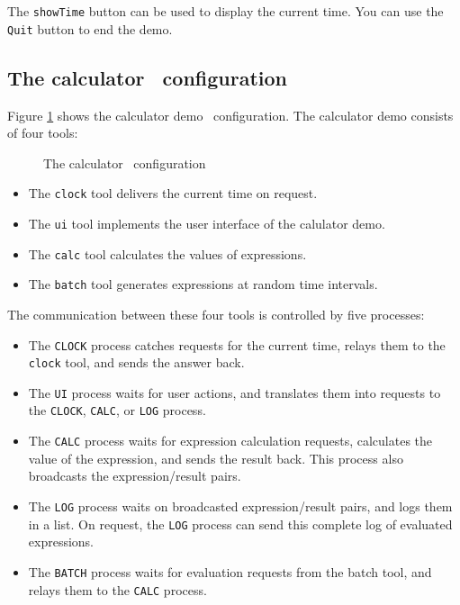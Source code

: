 \documentclass[a4paper,twoside]{article} %
\begin{document}
The {\tt showTime} button can be used to display the current time.
You can use the {\tt Quit} button to end the demo.

\subsection{The calculator \TB\ configuration}

Figure \ref{calc-impl} shows the calculator demo \TB\ configuration.
The calculator demo consists of four tools:

\begin{figure}[htb]
\centerline{}
\caption{The calculator \TB\ configuration}
\label{calc-impl}
\end{figure}

\begin{itemize}
\item The {\tt clock} tool delivers the current time on request.
\item The {\tt ui} tool implements the user interface of the calulator demo.
\item The {\tt calc} tool calculates the values of expressions.
\item The {\tt batch} tool generates expressions at random time intervals.
\end{itemize}

The communication between these four tools is controlled by five processes:
\begin{itemize}
\item The {\tt CLOCK} process catches requests for the current time,
      relays them to the {\tt clock} tool, and sends the answer back.
\item The {\tt UI} process waits for user actions, and translates
      them into requests to the {\tt CLOCK}, {\tt CALC}, or {\tt LOG}
      process.
\item The {\tt CALC} process waits for expression calculation requests,
      calculates the value of the expression, and sends the result back.
      This process also broadcasts the expression/result pairs.
\item The {\tt LOG} process waits on broadcasted expression/result pairs,
      and logs them in a list.
      On request, the {\tt LOG} process can send this complete log of
      evaluated expressions.
\item The {\tt BATCH} process waits for evaluation requests from the
      batch tool, and relays them to the {\tt CALC} process.
\end{itemize}
\end{document}
